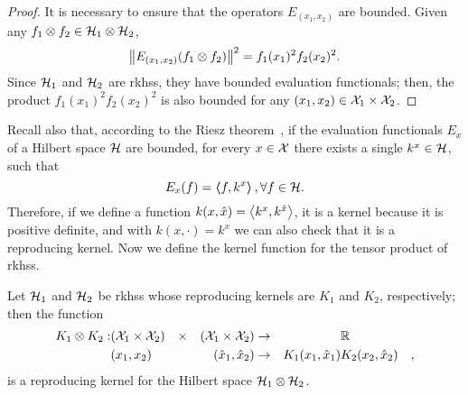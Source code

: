 \begin{proof}
    It is necessary to ensure that the operators $E_{(x_1, x_2)}$ are bounded. Given any $f_1 \otimes f_2 \in \mathcal{H}_1 \otimes \mathcal{H}_2$,
    $$ \left\lVert E_{(x_1, x_2)} (f_1 \otimes f_2)\right\rVert^2 = f_1(x_1)^2 f_2(x_2)^2 .$$
    Since $\mathcal{H}_1$ and $\mathcal{H}_2$ are \acrshort{rkhss}, they have bounded evaluation functionals; then, the product
    $ f_1(x_1)^2 f_2(x_2)^2$
    is also bounded for any $(x_1, x_2) \in \mathcal{X}_1 \times \mathcal{X}_2$.
\end{proof}
%
Recall also that, according to the Riesz theorem~\citep{Whittaker1991ACI}, if the evaluation functionals $E_x$ of a Hilbert space $\mathcal{H}$ are bounded, for every $x \in \mathcal{X}$ there exists a single $k^x \in \mathcal{H}$, such that 
$$ E_x(f) = \bm{\left\langle} f, k^x \bm{\right\rangle}, \forall f \in \mathcal{H} .$$
Therefore, if we define a function $k(x, \hat{x}) = \bm{\left\langle} k^x, k^{\hat{x}} \bm{\right\rangle}$, it is a kernel because it is positive definite, and with $k(x, \cdot) = k^x$ we can also check that it is a reproducing kernel.
%
Now we define the kernel function for the tensor product of \acrshort{rkhss}.
\begin{proposition}
    Let $\mathcal{H}_1$ and $\mathcal{H}_2$ be \acrshort{rkhss} whose reproducing kernels are $K_1$ and $K_2$, respectively;
    then the function
    \begin{equation}
        \nonumber
        \begin{aligned}
            K_1 \otimes K_2: & (\mathcal{X}_1 \times \mathcal{X}_2) & \times &  & (\mathcal{X}_1 \times \mathcal{X}_2) & \to &                     & \mathbb{R}              &   \\
                             & (x_1 , x_2)                  &        &  & (\hat{x}_1 , \hat{x}_2)      & \to & K_1(x_1, \hat{x}_1) & K_2(x_2, \hat{x}_2) & ,
        \end{aligned}
    \end{equation}
    is a reproducing kernel for the Hilbert space $\mathcal{H}_1 \otimes \mathcal{H}_2$.
\end{proposition}
